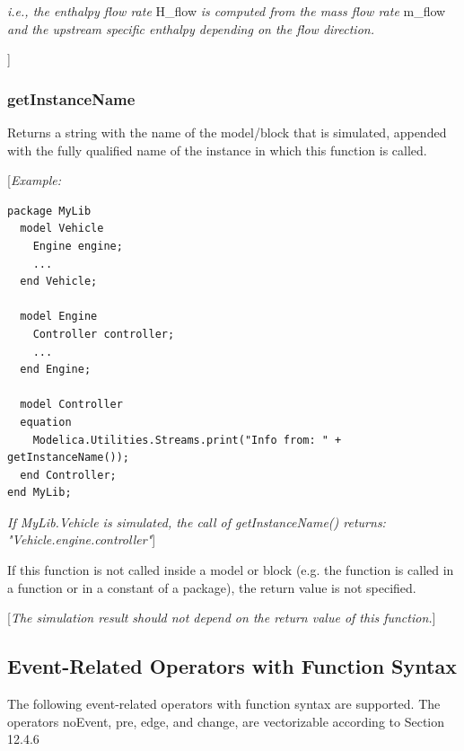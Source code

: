 \documentclass[10pt,a4paper]{report}
\def\Mcomment#1{{[}\emph{#1}{]}}
\def\Mcommentbegin#1{{[}\emph{#1}}
\def\Mcommentend#1{\emph{#1}{]}}
\def\doublelabel#1{\label{#1}\hypertarget{#1}{}}
\begin{document}
\emph{i.e., the enthalpy flow rate} H\_flow \emph{is computed from the
mass flow rate} m\_flow \emph{and the upstream specific enthalpy
depending on the flow direction. }

{]}

\subsubsection{getInstanceName}\doublelabel{getinstancename}

Returns a string with the name of the model/block that is simulated,
appended with the fully qualified name of the instance in which this
function is called.

\Mcommentbegin{Example:}

\begin{lstlisting}[language=modelica]
package MyLib
  model Vehicle
    Engine engine;
    ...
  end Vehicle;

  model Engine
    Controller controller;
    ...
  end Engine;

  model Controller
  equation
    Modelica.Utilities.Streams.print("Info from: " + getInstanceName());
  end Controller;
end MyLib;
\end{lstlisting}

\Mcommentend{If MyLib.Vehicle is simulated, the call of getInstanceName()
returns: "Vehicle.engine.controller"}

If this function is not called inside a model or block (e.g. the
function is called in a function or in a constant of a package), the
return value is not specified.

\Mcomment{The simulation result should not depend on the return value of
this function.}

\subsection{Event-Related Operators with Function Syntax}\doublelabel{event-related}

The following event-related operators with function syntax are
supported. The operators noEvent, pre, edge, and change, are
vectorizable according to Section 12.4.6
\end{document}
